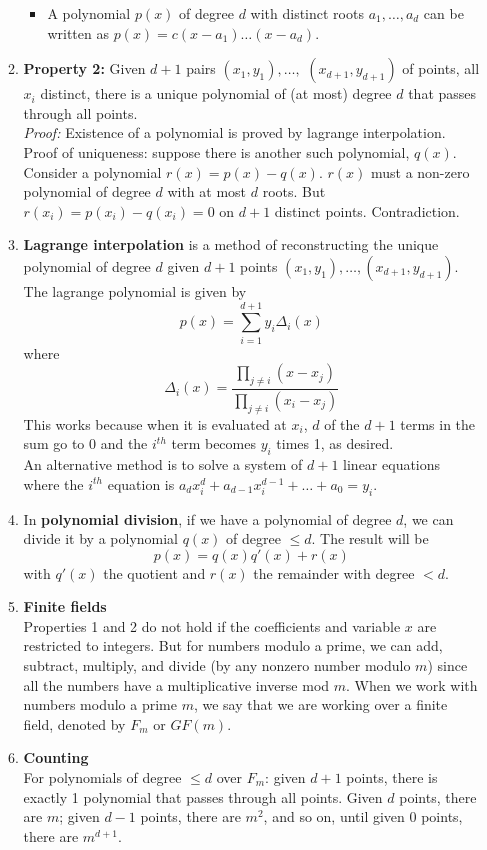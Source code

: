 \documentclass[10pt]{article}
\begin{document}
\begin{multicols}{2}
\begin{enumerate}
\begin{enumerate}
\begin{itemize}
        \item A polynomial $p(x)$ of degree $d$ with distinct roots $a_1,\hdots,a_d$ can be written as $p(x)=c(x-a_1) \ldots (x-a_d)$.
    \end{itemize}
    \item \textbf{Property 2:} Given $d+1$ pairs $(x_1,y_1),\hdots,$ $(x_{d+1}, y_{d+1})$ of points, all $x_i$ distinct, there is a unique polynomial of (at most) degree $d$ that passes through all points. \\
    \textit{Proof:} Existence of a polynomial is proved by lagrange interpolation. Proof of uniqueness: suppose there is another such polynomial, $q(x)$. Consider a polynomial $r(x)=p(x)-q(x)$. $r(x)$ must a non-zero polynomial of degree $d$ with at most $d$ roots. But $r(x_i)=p(x_i)-q(x_i)=0$ on $d+1$ distinct points. Contradiction.
    \item \textbf{Lagrange interpolation} is a method of reconstructing the unique polynomial of degree $d$ given $d+1$ points $(x_1,y_1), \hdots,(x_{d+1}, y_{d+1})$. The lagrange polynomial is given by 
    $$p(x)=\sum_{i=1}^{d+1} y_i \Delta_i(x)$$ where
    $$\Delta_i(x)=\frac{\prod_{j \neq i} (x-x_j)}{\prod_{j \neq i} (x_i-x_j)}$$ 
    This works because when it is evaluated at $x_i$, $d$ of the $d+1$ terms in the sum go to 0 and the $i^{th}$ term becomes $y_i$ times 1, as desired. \\[8 pt]
    An alternative method is to solve a system of $d+1$ linear equations where the $i^{th}$ equation is $a_dx_{i}^{d}+a_{d-1}x_i^{d-1}+\hdots+a_0=y_i$.
    \item In \textbf{polynomial division}, if we have a polynomial of degree $d$, we can divide it by a polynomial $q(x)$ of degree $\leq d$. The result will be $$p(x)=q(x)q'(x)+r(x)$$ with $q'(x)$ the quotient and $r(x)$ the remainder with degree $< d$.
    
    \item \textbf{Finite fields} \\
    Properties 1 and 2 do not hold if the coefficients and variable $x$ are restricted to integers. But for numbers modulo a prime, we can add, subtract, multiply, and divide (by any nonzero number modulo $m$) since all the numbers have a multiplicative inverse mod $m$. When we work with numbers modulo a prime $m$, we say that we are working over a finite field, denoted by $F_m$ or $GF(m)$.
    
    \item \textbf{Counting} \\
    For polynomials of degree $\leq d$ over $F_m$: given $d+1$ points, there is exactly 1 polynomial that passes through all points. Given $d$ points, there are $m$; given $d-1$ points, there are $m^{2}$, and so on, until given 0 points, there are $m^{d+1}$.
    

\end{enumerate}
\end{enumerate}
\end{multicols}
\end{document}
